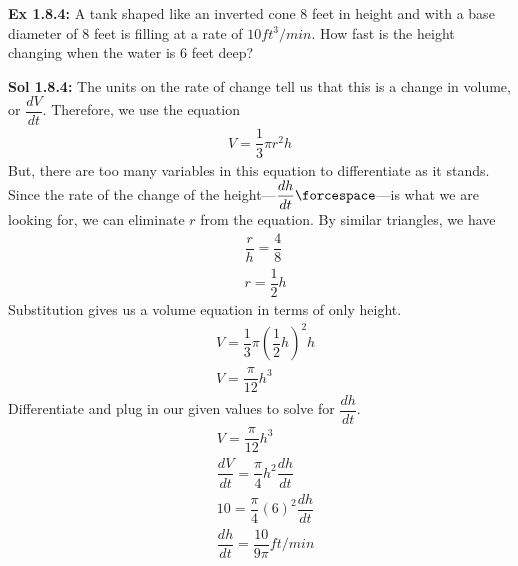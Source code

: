 \begin{tcolorbox}[example]
    \textbf{Ex 1.8.4: } A tank shaped like an inverted cone $8$ feet in height and with a base diameter of $8$ feet is filling at a rate of $10 \si{ft^3 \per min}$. How fast is the height changing when the water is $6$ feet deep? \\[11pt]

    \begin{center}
    \end{center}

\end{tcolorbox}
\begin{tcolorbox}[solution]
    \textbf{Sol 1.8.4: } The units on the rate of change tell us that this is a change in volume, or $\dfrac{dV}{dt}$. Therefore, we use the equation \begin{align*}
        V = \dfrac{1}{3}\pi r^2h
    \end{align*}
    But, there are too many variables in this equation to differentiate as it stands. Since the rate of the change of the height---$\dfrac{dh}{dt} \forcespace$---is what we are looking for, we can eliminate $r$ from the equation. By similar triangles, we have \begin{align*}
        & \dfrac{r}{h} = \dfrac{4}{8} \\[11pt]
        & r = \dfrac{1}{2}h
    \end{align*}
    Substitution gives us a volume equation in terms of only height. \begin{align*}
        & V = \dfrac{1}{3}\pi\left(\dfrac{1}{2}h\right)^2h \\[11pt]
        & V = \dfrac{\pi}{12}h^3
    \end{align*}
    Differentiate and plug in our given values to solve for $\dfrac{dh}{dt}$. \begin{align*}
        & V = \dfrac{\pi}{12}h^3 \\[11pt]
        & \dfrac{dV}{dt} = \dfrac{\pi}{4}h^2\dfrac{dh}{dt} \\[11pt]
        & 10 = \dfrac{\pi}{4}(6)^2\dfrac{dh}{dt} \\[11pt]
        & \dfrac{dh}{dt} = \boxed{\dfrac{10}{9\pi} \si{ft \per min}}
    \end{align*}
\end{tcolorbox} \vspace{11pt}

